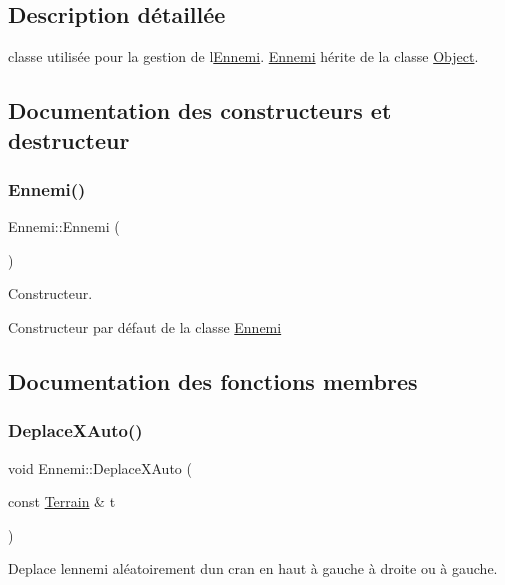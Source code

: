 \subsection{Description détaillée}
classe utilisée pour la gestion de l\textquotesingle{}\hyperlink{class_ennemi}{Ennemi}. \hyperlink{class_ennemi}{Ennemi} hérite de la classe \hyperlink{class_object}{Object}. 

\subsection{Documentation des constructeurs et destructeur}
\mbox{\label{class_ennemi_a9c5eb7ca82848b97f3dcf262fe625b3a}} 
\subsubsection{\texorpdfstring{Ennemi()}{Ennemi()}}
{\footnotesize\ttfamily Ennemi\+::\+Ennemi (\begin{DoxyParamCaption}{ }\end{DoxyParamCaption})}



Constructeur. 

Constructeur par défaut de la classe \hyperlink{class_ennemi}{Ennemi} 

\subsection{Documentation des fonctions membres}
\mbox{\label{class_ennemi_a649379ddaf7698276d924f48d56d87c5}} 
\subsubsection{\texorpdfstring{Deplace\+X\+Auto()}{DeplaceXAuto()}}
{\footnotesize\ttfamily void Ennemi\+::\+Deplace\+X\+Auto (\begin{DoxyParamCaption}\item[{const \hyperlink{class_terrain}{Terrain} \&}]{t }\end{DoxyParamCaption})}



Deplace l\textquotesingle{}ennemi aléatoirement d\textquotesingle{}un cran en haut à gauche à droite ou à gauche. 


